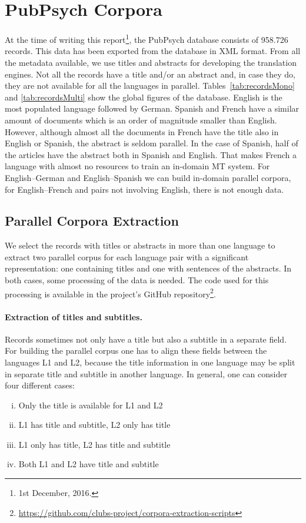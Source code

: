 \documentclass[a4paper,11pt]{article}
\begin{document}
\section{PubPsych Corpora}
\label{s:pub}

At the time of writing this report\footnote{1st December, 2016.}, the PubPsych database consists of 958.726 records. This data has been exported from the database in XML format. From all the metadata available, we use titles and abstracts for developing the translation engines. Not all the records have a title and/or an abstract and, in case they do, they are not available for all the languages in parallel. Tables~\ref{tab:recordsMono} and \ref{tab:recordsMulti} show the global figures of the database. English is the most populated language followed by German. Spanish and French have a similar amount of documents which is an order of magnitude smaller than English. However, although almost all the documents in French have the title also in English or Spanish, the abstract is seldom parallel. In the case of Spanish, half of the articles have the abstract both in Spanish and English. That makes French a language with almost no resources to train an in-domain MT system. For English--German and English--Spanish we can build in-domain parallel corpora, for English--French and pairs not involving English, there is not enough data.


\subsection{Parallel Corpora Extraction}
\label{ss:pubPar}

We select the records with titles or abstracts in more than one language to extract two parallel corpus for each language pair with a significant representation: one containing titles and one with sentences of the abstracts. In both cases, some processing of the data is needed. The code used for this processing is available in the project's GitHub repository\footnote{\url{https://github.com/clubs-project/corpora-extraction-scripts}}.

\paragraph{Extraction of titles and subtitles.}
Records sometimes not only have a title but also a subtitle in a separate field. For building the parallel corpus one has to align these fields between the languages L1 and L2, because the title information in one language may be split in separate title and subtitle in another language. In general, one can consider four different cases:
\begin{enumerate}[(i)]
\itemsep0em 
 \item Only the title is available for L1 and L2
 \item L1 has title and subtitle, L2 only has title
 \item L1 only has title, L2 has title and subtitle
 \item Both L1 and L2 have title and subtitle
\end{enumerate}
\end{document}

